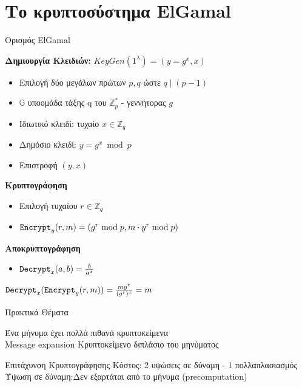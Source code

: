 \documentclass[handout]{beamer}
\begin{document}
\section{Το κρυπτοσύστημα ElGamal}
\begin{frame}{Ορισμός ElGamal}
 
\textbf{Δημιουργία Κλειδιών:}
$KeyGen(1^{\lambda}) = (y=g^x,x)$
\begin{itemize}
\item Επιλογή δύο μεγάλων πρώτων $p,q$ ώστε $q \mid (p-1)$  
\item $\mathbb{G}$ υποομάδα τάξης q του $\mathbb{Z}_p^*$ - γεννήτορας $g$
\item Ιδιωτικό κλειδί: τυχαίο $x \in \mathbb{Z}_q$
\item Δημόσιο κλειδί: $y = g^x \bmod{p}$
\item Επιστροφή $(y,x)$
\end{itemize}
\pause
 
\textbf{Κρυπτογράφηση} 
\begin{itemize}
\item Επιλογή τυχαίου $r \in \mathbb{Z}_q$
\item $\mathtt{Encrypt}_y(r,m) = (g^r \bmod p, m \cdot y^r \bmod p)$
\end{itemize}
\pause

\textbf{Αποκρυπτογράφηση}
\begin{itemize}
\item $\mathtt{Decrypt}_x(a,b) = \frac{b}{a^x}$
\end{itemize} 
\pause
 
\begin{block}{}
$\mathtt{Decrypt}_x(\mathtt{Encrypt}_y(r,m))= \frac{m y^r}{(g^r)^x} = m$
\end{block}

\end{frame}

\begin{frame}{Πρακτικά Θέματα}

 Ένα μήνυμα έχει πολλά πιθανά κρυπτοκείμενα \\
\pause
\alert{Message expansion} Κρυπτοκείμενο διπλάσιο του μηνύματος \\
\pause
\begin{block}{Επιτάχυνση Κρυπτογράφησης}
Κόστος: 2 υψώσεις σε δύναμη - 1 πολλαπλασιασμός\\
Ύψωση σε δύναμη:Δεν εξαρτάται από το μήνυμα (precomputation)
\end{block}

\end{frame}
\end{document}
